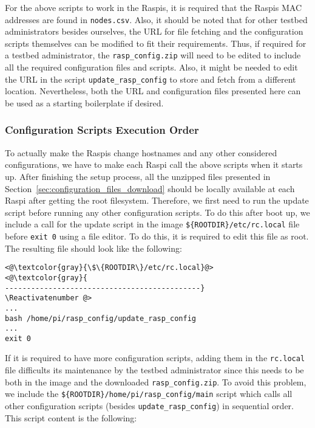 For the above scripts to work in the \ac{Raspi}s, it is required that the
\ac{Raspi}s \ac{MAC} addresses are found in \texttt{nodes.csv}. Also, it
should be noted that for other testbed administrators besides ourselves,
the \ac{URL} for file fetching and the configuration
scripts themselves can be modified to fit their requirements. Thus, if
required for a testbed administrator, the \texttt{rasp\_config.zip}
will need to be edited to include all the required configuration files
and scripts. Also, it might be needed to edit the \ac{URL} in the script
\texttt{update\_rasp\_config} to store and fetch from a different location.
Nevertheless, both the \ac{URL} and configuration files presented here can be
used as a starting boilerplate if desired.

\subsubsection{Configuration Scripts Execution Order}
To actually make the \ac{Raspi}s change hostnames and any other considered
configurations, we have to make each \ac{Raspi} call the above scripts when
it starts up. After finishing the setup process, all the unzipped files
presented in Section~\ref{sec:configuration_files_download} should be
locally available at each \ac{Raspi} after getting the root filesystem.
Therefore, we first need to run the update script before running
any other configuration scripts. To do this after boot up, we include
a call for the update script in the image \texttt{\$\{ROOTDIR\}/etc/rc.local}
file before \texttt{exit 0} using a file editor. To do this, it is required
to edit this file as root. The resulting file should look like the following:

\Suppressnumber\begin{lstlisting}[]
<@\textcolor{gray}{\$\{ROOTDIR\}/etc/rc.local}@>
<@\textcolor{gray}{
---------------------------------------------}
\Reactivatenumber @>
...
bash /home/pi/rasp_config/update_rasp_config
...
exit 0
\end{lstlisting}
\FloatBarrier
\vspace{-5mm}

If it is required to have more configuration scripts, adding them
in the \texttt{rc.local} file difficults its maintenance by the testbed
administrator since this needs to be both in the image and the
downloaded \texttt{rasp\_config.zip}. To avoid this problem, we include
the \texttt{\$\{ROOTDIR\}/home/pi/rasp\_config/main} script which
calls all other configuration scripts (besides \texttt{update\_rasp\_config})
in sequential order. This script content is the following:

